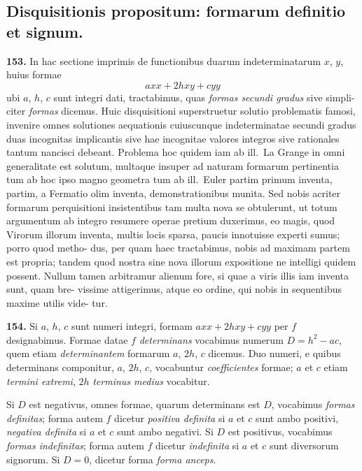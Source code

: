 \documentclass[12pt,a4paper]{article}
\begin{document}
\subsection*{Disquisitionis propositum: formarum definitio et signum.}

\textbf{153.}
In hac sectione imprimis de functionibus duarum indeterminatarum $x$, $y$,
huius formae
\[
axx + 2hxy + cyy
\]
ubi $a$, $h$, $c$ sunt integri dati, tractabimus, quas \textit{formas secundi gradus} sive simpli-
citer \textit{formas} dicemus. Huic disquisitioni superstruetur solutio problematis famosi,
invenire omnes solutiones aequationis cuiuscunque indeterminatae secundi gradus
duas incognitas implicantis sive hae incognitae valores integros sive rationales
tantum nancisci debeant. Problema hoc quidem iam ab ill.\ La Grange in omni
generalitate est solutum, multaque insuper ad naturam formarum pertinentia tum
ab hoc ipso magno geometra tum ab ill.\ Euler partim primum inventa, partim,
a Fermatio olim inventa, demonstrationibus munita. Sed nobis acriter formarum
perquisitioni insistentibus tam multa nova se obtulerunt, ut totum argumentum
ab integro resumere operae pretium duxerimus, eo magis, quod Virorum illorum
inventa, multis locis sparsa, paucis innotuisse experti sumus; porro quod metho-
dus, per quam haec tractabimus, nobis ad maximam partem est propria; tandem
quod nostra sine nova illorum expositione ne intelligi quidem possent. Nullum
tamen arbitramur alienum fore, si quae a viris illis iam inventa sunt, quam bre-
vissime attigerimus, atque eo ordine, qui nobis in sequentibus maxime utilis vide-
tur.

\textbf{154.}
Si $a$, $h$, $c$ sunt numeri integri, formam $axx + 2hxy + cyy$ per $f$
designabimus. Formae datae $f$ \textit{determinans} vocabimus numerum $D = h^2 - ac$,
quem etiam \textit{determinantem} formarum $a$, $2h$, $c$ dicemus. Duo numeri, e quibus
determinans componitur, $a$, $2h$, $c$, vocabuntur \textit{coefficientes} formae; $a$ et $c$ etiam
\textit{termini extremi}, $2h$ \textit{terminus medius} vocabitur.

Si $D$ est negativus, omnes formae, quarum determinans est $D$, vocabimus
\textit{formas definitas}; forma autem $f$ dicetur \textit{positiva definita} si $a$ et $c$ sunt ambo
positivi, \textit{negativa definita} si $a$ et $c$ sunt ambo negativi. Si $D$ est positivus,
vocabimus \textit{formas indefinitas}; forma autem $f$ dicetur \textit{indefinita} si $a$ et $c$ sunt
diversorum signorum. Si $D = 0$, dicetur forma \textit{forma anceps}.
\end{document}
